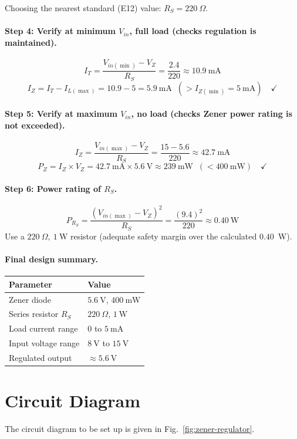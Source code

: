 Choosing the nearest standard (E12) value: $\boxed{R_S = 220\ \Omega}$.

\paragraph{Step 4: Verify at minimum $V_{in}$, full load (checks regulation is maintained).}
\[
I_{T} = \frac{V_{in(\min)} - V_Z}{R_S} = \frac{2.4}{220} \approx 10.9\ \text{mA}
\]
\[
I_Z = I_T - I_{L(\max)} = 10.9 - 5 = 5.9\ \text{mA} \;\; (> I_{Z(\min)} = 5\ \text{mA}) \quad \checkmark
\]

\paragraph{Step 5: Verify at maximum $V_{in}$, no load (checks Zener power rating is not exceeded).}
\[
I_{Z} = \frac{V_{in(\max)} - V_Z}{R_S} = \frac{15 - 5.6}{220} \approx 42.7\ \text{mA}
\]
\[
P_Z = I_Z \times V_Z = 42.7\ \text{mA} \times 5.6\ \text{V} \approx 239\ \text{mW} \;\; (< 400\ \text{mW}) \quad \checkmark
\]

\paragraph{Step 6: Power rating of $R_S$.}
\[
P_{R_S} = \frac{(V_{in(\max)} - V_Z)^2}{R_S} = \frac{(9.4)^2}{220} \approx 0.40\ \text{W}
\]
Use a $220\ \Omega,\ 1\ \text{W}$ resistor (adequate safety margin over the calculated $0.40$~W).

\paragraph{Final design summary.}
\begin{center}
	\begin{tabular}{@{}ll@{}}
		\toprule
		Parameter & Value \\
		\midrule
		Zener diode & $5.6\ \text{V}$, $400\ \text{mW}$ \\
		Series resistor $R_S$ & $220\ \Omega$, $1\ \text{W}$ \\
		Load current range & $0$ to $5\ \text{mA}$ \\
		Input voltage range & $8\ \text{V}$ to $15\ \text{V}$ \\
		Regulated output & $\approx 5.6\ \text{V}$ \\
		\bottomrule
	\end{tabular}
\end{center}

\section{Circuit Diagram}
The circuit diagram to be set up is given in Fig.~\ref{fig:zener-regulator}.

